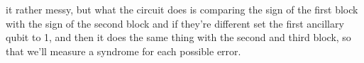 \documentclass{article}
\begin{document}
	\begin{figure}[H]
	\centering
	\end{figure}  
	\noindent it rather messy, but what the circuit does is comparing the sign of the first block with the sign of the second block and if they're different set the first ancillary qubit to 1, and then it does the same thing with the second and third block, so that we'll measure a syndrome for each possible error.\\
	
\end{document}

